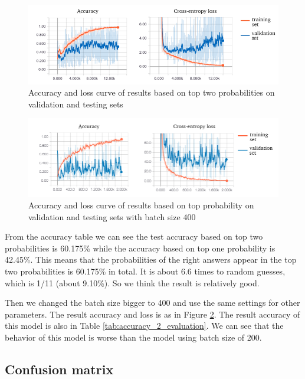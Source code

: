 \documentclass{article}
\begin{document}
\begin{figure}[h!]
\centering
\includegraphics[width=\textwidth]{accuracy_top2.png}
\caption{Accuracy and loss curve of results based on top two probabilities on validation and testing sets}
\label{fig:accuracy_top2}
\end{figure}

\begin{figure}[h!]
\centering
\includegraphics[width=\textwidth]{accuracy_loss_400.png}
\caption{Accuracy and loss curve of results based on top probability on validation and testing sets with batch size 400}
\label{fig:accuracy_top1_400}
\end{figure}

\noindent From the accuracy table we can see the test accuracy based on top two probabilities is 60.175\% while the accuracy based on top one probability is 42.45\%. This means that the probabilities of the right answers appear in the top two probabilities is 60.175\% in total. It is about 6.6 times to random guesses, which is 1/11 (about 9.10\%). So we think the result is relatively good.

\noindent Then we changed the batch size bigger to 400 and use the same settings for other parameters. The result accuracy and loss is as in Figure \ref{fig:accuracy_top1_400}. The result accuracy of this model is also in Table \ref{tab:accuracy_2_evaluation}. We can see that the behavior of this model is worse than the model using batch size of 200.

\subsection{Confusion matrix}
\end{document}
